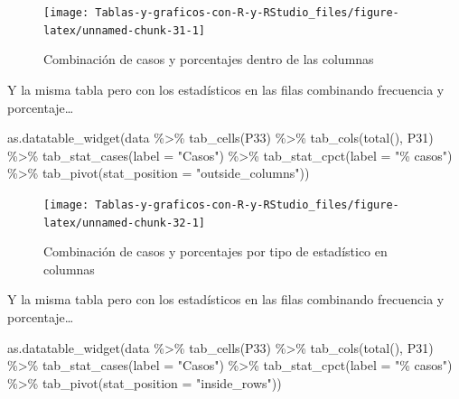 \documentclass[
]{book}
\newenvironment{Shaded}{\begin{snugshade}}{\end{snugshade}}
\newcommand{\AttributeTok}[1]{\textcolor[rgb]{0.77,0.63,0.00}{#1}}
\newcommand{\FunctionTok}[1]{\textcolor[rgb]{0.00,0.00,0.00}{#1}}
\newcommand{\NormalTok}[1]{#1}
\newcommand{\SpecialCharTok}[1]{\textcolor[rgb]{0.00,0.00,0.00}{#1}}
\newcommand{\StringTok}[1]{\textcolor[rgb]{0.31,0.60,0.02}{#1}}
\begin{document}
\begin{figure}[H]

{\centering \texttt{[image: Tablas-y-graficos-con-R-y-RStudio\_files/figure-latex/unnamed-chunk-31-1]} 

}

\caption{Combinación de casos y porcentajes dentro de las columnas}\label{fig:unnamed-chunk-31}
\end{figure}

Y la misma tabla pero con los estadísticos en las filas combinando frecuencia y porcentaje\ldots{}

\begin{Shaded}
\begin{Highlighting}[]
\FunctionTok{as.datatable\_widget}\NormalTok{(data }\SpecialCharTok{\%\textgreater{}\%}
  \FunctionTok{tab\_cells}\NormalTok{(P33) }\SpecialCharTok{\%\textgreater{}\%}
  \FunctionTok{tab\_cols}\NormalTok{(}\FunctionTok{total}\NormalTok{(), P31) }\SpecialCharTok{\%\textgreater{}\%}
  \FunctionTok{tab\_stat\_cases}\NormalTok{(}\AttributeTok{label =} \StringTok{"Casos"}\NormalTok{) }\SpecialCharTok{\%\textgreater{}\%}
  \FunctionTok{tab\_stat\_cpct}\NormalTok{(}\AttributeTok{label =} \StringTok{"\% casos"}\NormalTok{) }\SpecialCharTok{\%\textgreater{}\%}
  \FunctionTok{tab\_pivot}\NormalTok{(}\AttributeTok{stat\_position =} \StringTok{"outside\_columns"}\NormalTok{))}
\end{Highlighting}
\end{Shaded}

\begin{figure}[H]

{\centering \texttt{[image: Tablas-y-graficos-con-R-y-RStudio\_files/figure-latex/unnamed-chunk-32-1]} 

}

\caption{Combinación de casos y porcentajes por tipo de estadístico en columnas}\label{fig:unnamed-chunk-32}
\end{figure}

Y la misma tabla pero con los estadísticos en las filas combinando frecuencia y porcentaje\ldots{}

\begin{Shaded}
\begin{Highlighting}[]
\FunctionTok{as.datatable\_widget}\NormalTok{(data }\SpecialCharTok{\%\textgreater{}\%}
  \FunctionTok{tab\_cells}\NormalTok{(P33) }\SpecialCharTok{\%\textgreater{}\%}
  \FunctionTok{tab\_cols}\NormalTok{(}\FunctionTok{total}\NormalTok{(), P31) }\SpecialCharTok{\%\textgreater{}\%}
  \FunctionTok{tab\_stat\_cases}\NormalTok{(}\AttributeTok{label =} \StringTok{"Casos"}\NormalTok{) }\SpecialCharTok{\%\textgreater{}\%}
  \FunctionTok{tab\_stat\_cpct}\NormalTok{(}\AttributeTok{label =} \StringTok{"\% casos"}\NormalTok{) }\SpecialCharTok{\%\textgreater{}\%}
  \FunctionTok{tab\_pivot}\NormalTok{(}\AttributeTok{stat\_position =} \StringTok{"inside\_rows"}\NormalTok{))}
\end{Highlighting}
\end{Shaded}
\end{document}
